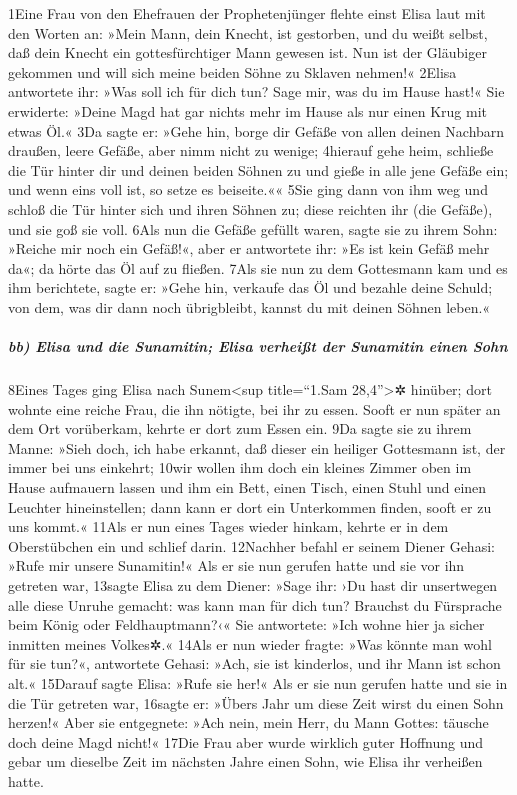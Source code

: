 1Eine Frau von den Ehefrauen der Prophetenjünger flehte einst Elisa laut
mit den Worten an: »Mein Mann, dein Knecht, ist gestorben, und du weißt
selbst, daß dein Knecht ein gottesfürchtiger Mann gewesen ist. Nun ist
der Gläubiger gekommen und will sich meine beiden Söhne zu Sklaven
nehmen!« 2Elisa antwortete ihr: »Was soll ich für dich tun? Sage mir,
was du im Hause hast!« Sie erwiderte: »Deine Magd hat gar nichts mehr im
Hause als nur einen Krug mit etwas Öl.« 3Da sagte er: »Gehe hin, borge
dir Gefäße von allen deinen Nachbarn draußen, leere Gefäße, aber nimm
nicht zu wenige; 4hierauf gehe heim, schließe die Tür hinter dir und
deinen beiden Söhnen zu und gieße in alle jene Gefäße ein; und wenn eins
voll ist, so setze es beiseite.«« 5Sie ging dann von ihm weg und schloß
die Tür hinter sich und ihren Söhnen zu; diese reichten ihr (die
Gefäße), und sie goß sie voll. 6Als nun die Gefäße gefüllt waren, sagte
sie zu ihrem Sohn: »Reiche mir noch ein Gefäß!«, aber er antwortete ihr:
»Es ist kein Gefäß mehr da«; da hörte das Öl auf zu fließen. 7Als sie
nun zu dem Gottesmann kam und es ihm berichtete, sagte er: »Gehe hin,
verkaufe das Öl und bezahle deine Schuld; von dem, was dir dann noch
übrigbleibt, kannst du mit deinen Söhnen leben.«

\hypertarget{bb-elisa-und-die-sunamitin-elisa-verheiuxdft-der-sunamitin-einen-sohn}{%
\subparagraph{bb) Elisa und die Sunamitin; Elisa verheißt der Sunamitin
einen
Sohn}\label{bb-elisa-und-die-sunamitin-elisa-verheiuxdft-der-sunamitin-einen-sohn}}

8Eines Tages ging Elisa nach Sunem\textless sup title=``1.Sam
28,4''\textgreater✲ hinüber; dort wohnte eine reiche Frau, die ihn
nötigte, bei ihr zu essen. Sooft er nun später an dem Ort vorüberkam,
kehrte er dort zum Essen ein. 9Da sagte sie zu ihrem Manne: »Sieh doch,
ich habe erkannt, daß dieser ein heiliger Gottesmann ist, der immer bei
uns einkehrt; 10wir wollen ihm doch ein kleines Zimmer oben im Hause
aufmauern lassen und ihm ein Bett, einen Tisch, einen Stuhl und einen
Leuchter hineinstellen; dann kann er dort ein Unterkommen finden, sooft
er zu uns kommt.« 11Als er nun eines Tages wieder hinkam, kehrte er in
dem Oberstübchen ein und schlief darin. 12Nachher befahl er seinem
Diener Gehasi: »Rufe mir unsere Sunamitin!« Als er sie nun gerufen hatte
und sie vor ihn getreten war, 13sagte Elisa zu dem Diener: »Sage ihr:
›Du hast dir unsertwegen alle diese Unruhe gemacht: was kann man für
dich tun? Brauchst du Fürsprache beim König oder Feldhauptmann?‹« Sie
antwortete: »Ich wohne hier ja sicher inmitten meines Volkes✲.« 14Als er
nun wieder fragte: »Was könnte man wohl für sie tun?«, antwortete
Gehasi: »Ach, sie ist kinderlos, und ihr Mann ist schon alt.« 15Darauf
sagte Elisa: »Rufe sie her!« Als er sie nun gerufen hatte und sie in die
Tür getreten war, 16sagte er: »Übers Jahr um diese Zeit wirst du einen
Sohn herzen!« Aber sie entgegnete: »Ach nein, mein Herr, du Mann Gottes:
täusche doch deine Magd nicht!« 17Die Frau aber wurde wirklich guter
Hoffnung und gebar um dieselbe Zeit im nächsten Jahre einen Sohn, wie
Elisa ihr verheißen hatte.


